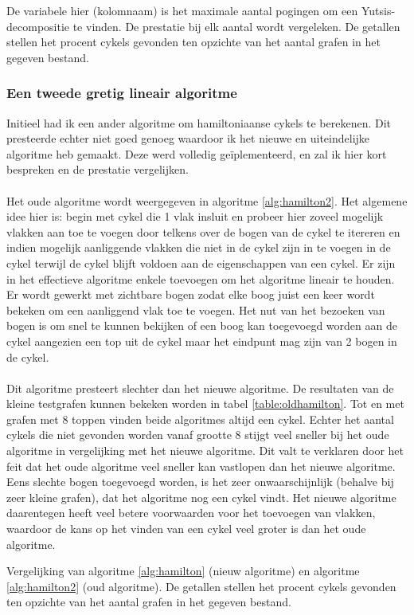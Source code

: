 \documentclass[11pt, a4paper, table]{article}
\theoremstyle{definition}
\theoremstyle{definition}
\theoremstyle{definition}
\begin{document}
\begin{table}[bh]
	\center
	\caption{De variabele hier (kolomnaam) is het maximale aantal pogingen om een Yutsis-decompositie te vinden. De prestatie bij elk aantal wordt vergeleken. De getallen stellen het procent cykels gevonden ten opzichte van het aantal grafen in het gegeven bestand.
		\label{table:multipletrials}
	} 
\end{table}

\subsubsection{Een tweede gretig lineair algoritme}
Initieel had ik een ander algoritme om hamiltoniaanse cykels te berekenen. Dit presteerde echter niet goed genoeg waardoor ik het nieuwe en uiteindelijke algoritme heb gemaakt. Deze werd volledig ge\"{i}plementeerd, en zal ik hier kort bespreken en de prestatie vergelijken. 
\\\\Het oude algoritme wordt weergegeven in algoritme \ref{alg:hamilton2}.
Het algemene idee hier is: begin met cykel die 1 vlak insluit en probeer hier zoveel mogelijk vlakken aan toe te voegen door telkens over de bogen van de cykel te itereren en indien mogelijk aanliggende vlakken die niet in de cykel zijn in te voegen in de cykel terwijl de cykel blijft voldoen aan de eigenschappen van een cykel. Er zijn in het effectieve algoritme enkele toevoegen om het algoritme lineair te houden. Er wordt gewerkt met zichtbare bogen zodat elke boog juist een keer wordt bekeken om een aanliggend vlak toe te voegen. Het nut van het bezoeken van bogen is om snel te kunnen bekijken of een boog kan toegevoegd worden aan de cykel aangezien een top uit de cykel maar het eindpunt mag zijn van 2 bogen in de cykel. 
\\\\Dit algoritme presteert slechter dan het nieuwe algoritme. De resultaten van de kleine testgrafen kunnen bekeken worden in tabel \ref{table:oldhamilton}. Tot en met grafen met 8 toppen vinden beide algoritmes altijd een cykel. Echter het aantal cykels die niet gevonden worden vanaf grootte 8 stijgt veel sneller bij het oude algoritme in vergelijking met het nieuwe algoritme. Dit valt te verklaren door het feit dat het oude algoritme veel sneller kan vastlopen dan het nieuwe algoritme. Eens slechte bogen toegevoegd worden, is het zeer onwaarschijnlijk (behalve bij zeer kleine grafen), dat het algoritme nog een cykel vindt. Het nieuwe algoritme daarentegen heeft veel betere voorwaarden voor het toevoegen van vlakken, waardoor de kans op het vinden van een cykel veel groter is dan het oude algoritme. 
\newline
\begin{table}
	\center
	\caption{Vergelijking van algoritme \ref{alg:hamilton} (nieuw algoritme) en algoritme \ref{alg:hamilton2}  (oud algoritme). De getallen stellen het procent cykels gevonden ten opzichte van het aantal grafen in het gegeven bestand.
	\label{table:oldhamilton}
	} 
\end{table}
\end{document}
